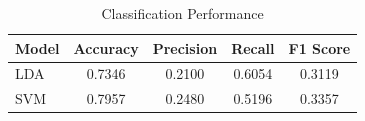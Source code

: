 \begin{table}[htbp]
\caption{Classification Performance}
\label{tab:perf}
\centering
\begin{tabular}{lcccc}
\toprule
Model & Accuracy & Precision & Recall & F1 Score \\
\midrule
LDA & 0.7346 & 0.2100 & 0.6054 & 0.3119 \\
SVM & 0.7957 & 0.2480 & 0.5196 & 0.3357 \\
\bottomrule
\end{tabular}
\end{table}
